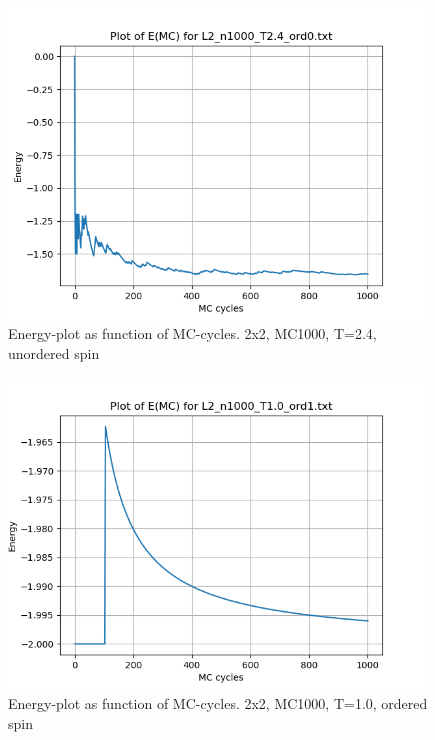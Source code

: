 \documentclass{article}
\begin{document}
  \begin{figure}[ht]
      \centering
      \includegraphics[width = 11cm]{img/energy_L2_n1000_T24_ord0.png}
      \caption{Energy-plot as function of MC-cycles. 2x2, MC1000, T=2.4, unordered spin}
      \label{fig:energy_L2_n1000_T2.4_ord0}
    \end{figure}

  \begin{figure}[ht]
      \centering
      \includegraphics[width = 11cm]{img/energy_L2_n1000_T10_ord1.png}
      \caption{Energy-plot as function of MC-cycles. 2x2, MC1000, T=1.0, ordered spin}
      \label{fig:energy_L2_n1000_T1.0_ord1}
    \end{figure}
\end{document}
